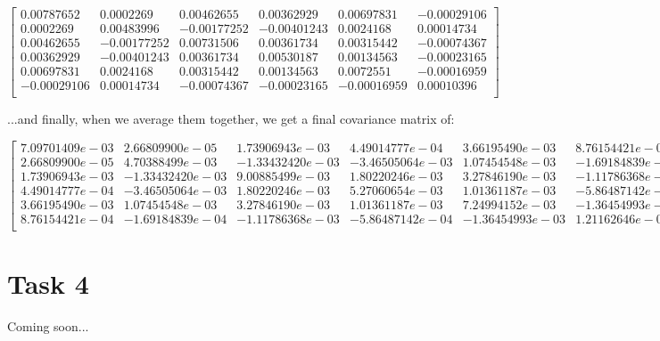 \documentclass{article}
\begin{document}
\begin{equation}
    \begin{bmatrix}
        0.00787652  & 0.0002269   & 0.00462655  & 0.00362929  & 0.00697831  & -0.00029106 \\
        0.0002269   & 0.00483996  & -0.00177252 & -0.00401243 & 0.0024168   & 0.00014734  \\
        0.00462655  & -0.00177252 & 0.00731506  & 0.00361734  & 0.00315442  & -0.00074367 \\
        0.00362929  & -0.00401243 & 0.00361734  & 0.00530187  & 0.00134563  & -0.00023165 \\
        0.00697831  & 0.0024168   & 0.00315442  & 0.00134563  & 0.0072551   & -0.00016959 \\
        -0.00029106 & 0.00014734  & -0.00074367 & -0.00023165 & -0.00016959 & 0.00010396  \\
    \end{bmatrix}
\end{equation}

...and finally, when we average them together, we get a final covariance matrix of:

\begin{equation}
    \begin{bmatrix}
        7.09701409e-03 & 2.66809900e-05  & 1.73906943e-03  & 4.49014777e-04  & 3.66195490e-03  & 8.76154421e-04  \\
        2.66809900e-05 & 4.70388499e-03  & -1.33432420e-03 & -3.46505064e-03 & 1.07454548e-03  & -1.69184839e-04 \\
        1.73906943e-03 & -1.33432420e-03 & 9.00885499e-03  & 1.80220246e-03  & 3.27846190e-03  & -1.11786368e-03 \\
        4.49014777e-04 & -3.46505064e-03 & 1.80220246e-03  & 5.27060654e-03  & 1.01361187e-03  & -5.86487142e-04 \\
        3.66195490e-03 & 1.07454548e-03  & 3.27846190e-03  & 1.01361187e-03  & 7.24994152e-03  & -1.36454993e-03 \\
        8.76154421e-04 & -1.69184839e-04 & -1.11786368e-03 & -5.86487142e-04 & -1.36454993e-03 & 1.21162646e-03  \\
    \end{bmatrix}
\end{equation}

\section*{Task 4}

Coming soon...
\end{document}

